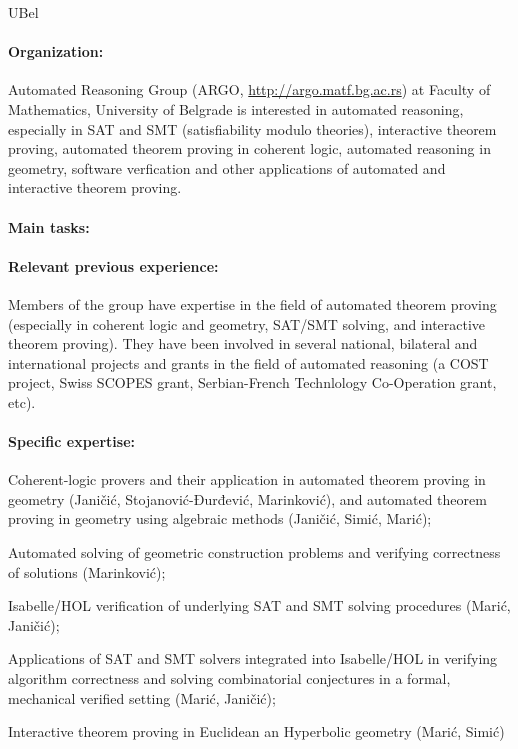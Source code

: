 \begin{sitedescription}{UBel}

\paragraph{Organization:}
Automated Reasoning Group (ARGO, \url{http://argo.matf.bg.ac.rs}) at
Faculty of Mathematics, University of Belgrade is interested in
automated reasoning, especially in SAT and SMT (satisfiability modulo
theories), interactive theorem proving, automated theorem proving in
coherent logic, automated reasoning in geometry, software verfication
and other applications of automated and interactive theorem proving.

\paragraph{Main tasks:}

\begin{compactitem}
\item{} 
\end{compactitem}


\paragraph{Relevant previous experience:}

Members of the group have expertise in the field of automated theorem
proving (especially in coherent logic and geometry, SAT/SMT solving,
and interactive theorem proving). They have been involved in several
national, bilateral and international projects and grants in the field
of automated reasoning (a COST project, Swiss SCOPES grant,
Serbian-French Technlology Co-Operation grant, etc).

\paragraph{Specific expertise:}

\begin{compactitem}
\item Coherent-logic provers and their application in automated
  theorem proving in geometry (Janičić, Stojanović-Đurđević,
  Marinković), and automated theorem proving in geometry using
  algebraic methods (Janičić, Simić, Marić);
\item Automated solving of geometric construction problems and
  verifying correctness of solutions (Marinković);
\item Isabelle/HOL verification of underlying SAT and SMT solving
 procedures (Marić, Janičić);
\item Applications of SAT and SMT solvers integrated into Isabelle/HOL
  in verifying algorithm correctness and solving combinatorial
  conjectures in a formal, mechanical verified setting (Marić,
  Janičić);
\item Interactive theorem proving in Euclidean an Hyperbolic geometry
  (Marić, Simić)
\end{compactitem}


\end{sitedescription}
